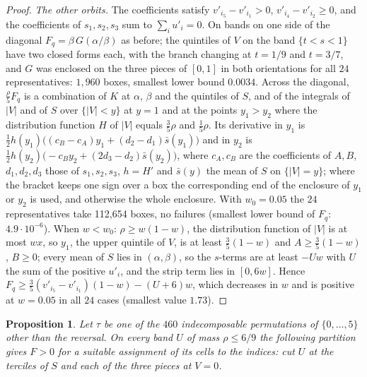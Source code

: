 \documentclass[11pt]{amsart}
\newtheorem{proposition}[theorem]{Proposition}
\theoremstyle{definition}
\theoremstyle{remark}
\numberwithin{equation}{section}
\begin{document}
\begin{proof}
\emph{The other orbits.} The coefficients satisfy $v'_{i_5}-v'_{i_1}>0$, $v'_{i_4}-v'_{i_2}\ge0$, and the coefficients of
$s_1,s_2,s_3$ sum to $\sum_iu'_i=0$. On bands on one side of the diagonal $F_q=\beta\,G(\alpha/\beta)$ as before; the
quintiles of $V$ on the band $\{t<s<1\}$ have two closed forms each, with the branch changing at $t=1/9$ and $t=3/7$, and
$G$ was enclosed on the three pieces of $[0,1]$ in both orientations for all $24$ representatives: $1{,}960$ boxes, smallest
lower bound $0.0034$. Across the diagonal, $\frac{\rho}{5}F_q$ is a combination of $K$ at $\alpha$, $\beta$ and the
quintiles of $S$, and of the integrals of $|V|$ and of $S$ over $\{|V|<y\}$ at $y=1$ and at the points $y_1>y_2$ where the
distribution function $H$ of $|V|$ equals $\frac35\rho$ and $\frac15\rho$. Its derivative in $y_1$ is $\frac12h(y_1)\bigl((c_B-c_A)y_1+(d_2-d_1)\bar s(y_1)\bigr)$ and in $y_2$ is
$\frac12h(y_2)\bigl(-c_By_2+(2d_3-d_2)\bar s(y_2)\bigr)$, where $c_A,c_B$ are the coefficients of $A,B$, $d_1,d_2,d_3$ those
of $s_1,s_2,s_3$, $h=H'$ and $\bar s(y)$ the mean of $S$ on $\{|V|=y\}$; where the bracket keeps one sign
over a box the corresponding end of the enclosure of $y_1$ or $y_2$ is used, and otherwise the whole enclosure. With
$w_0=0.05$ the $24$ representatives take 112{,}654 boxes, no failures (smallest lower bound of $F_q$: $4.9\cdot10^{-6}$). When $w<w_0$:
$\rho\ge w(1-w)$, the distribution function of $|V|$ is at most $wx$, so $y_1$, the upper quintile of $V$, is at least
$\frac35(1-w)$ and $A\ge\frac35(1-w)$, $B\ge0$; every mean of $S$ lies in $(\alpha,\beta)$, so the $s$-terms are at least
$-Uw$ with $U$ the sum of the positive $u'_i$, and the strip term lies in $[0,6w]$. Hence
$F_q\ge\frac35(v'_{i_5}-v'_{i_1})(1-w)-(U+6)w$, which decreases in $w$ and is positive at $w=0.05$ in all $24$ cases (smallest value $1.73$).
\end{proof}

\begin{proposition}\label{prop:r6}
Let $\tau$ be one of the $460$ indecomposable permutations of $\{0,\dots,5\}$ other than the reversal. On every band $U$
of mass $\rho\le6/9$ the following partition gives $F>0$ for a suitable assignment of its cells to the indices: cut $U$
at the terciles of $S$ and each of the three pieces at $V=0$.
\end{proposition}
\end{document}
